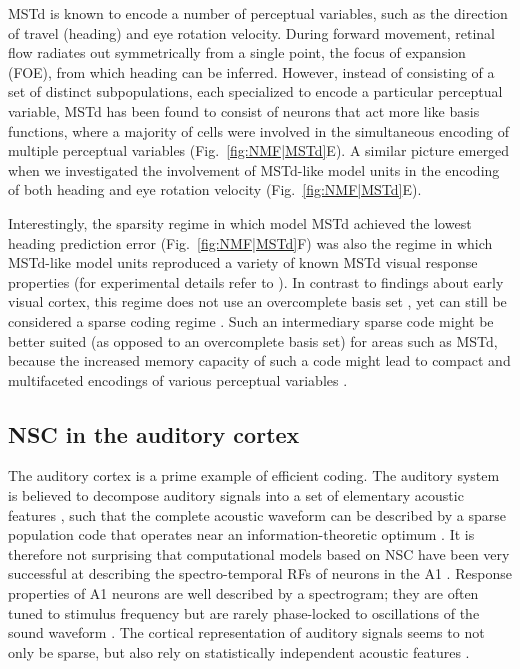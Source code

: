 \ac{MSTd} is known to encode a number of perceptual variables,
such as the direction of travel (heading) and eye rotation velocity.
During forward movement, retinal flow radiates out symmetrically from a single point,
the focus of expansion (FOE), from which heading can be inferred.
However, instead of consisting of a set of distinct subpopulations,
each specialized to encode a particular perceptual variable,
\ac{MSTd} has been found to consist of neurons that act more like basis functions,
where a majority of cells were involved in the simultaneous encoding of multiple
perceptual variables (Fig.~\ref{fig:NMF|MSTd}E).
A similar picture emerged when we investigated the involvement of \ac{MSTd}-like
model units in the encoding of both heading and eye rotation velocity
(Fig.~\ref{fig:NMF|MSTd}E).

Interestingly, the sparsity regime in which model \ac{MSTd} achieved the
lowest heading prediction error (Fig.~\ref{fig:NMF|MSTd}F) was also the
regime in which \ac{MSTd}-like model units reproduced a variety of known
\ac{MSTd} visual response properties
(for experimental details refer to \cite{Beyeler2016}).
In contrast to findings about early visual cortex,
this regime does not use an overcomplete basis set \cite{OlshausenField1996},
yet can still be considered a sparse coding regime \cite{SpanneJorntell2015}.
Such an intermediary sparse code might be better suited
(as opposed to an overcomplete basis set)
for areas such as \ac{MSTd},
because the increased memory capacity of such a code might lead to compact
and multifaceted encodings of various perceptual variables
\cite{BenHamed2003}.


\subsection*{NSC in the auditory cortex}

The auditory cortex is a prime example of efficient coding. The auditory system is believed to decompose auditory signals into
a set of elementary acoustic features \cite{SmithLewicki2006},
such that the complete acoustic waveform can be described by a
sparse population code that operates near an information-theoretic optimum
\cite{SmithLewicki2006,rokem2006,Hromadka2008}.
It is therefore not surprising that computational models based on \ac{NSC}
have been very successful at describing the spectro-temporal \acp{RF}
of neurons in the \ac{A1} \cite{Martinez2015,David2007}.
Response properties of \ac{A1} neurons are well described by a spectrogram;
they are often tuned to stimulus frequency but are rarely phase-locked
to oscillations of the sound waveform \cite{Leaver2010}.
The cortical representation of auditory signals seems to not only be sparse,
but also rely on statistically independent acoustic features \cite{Klein2003}.

